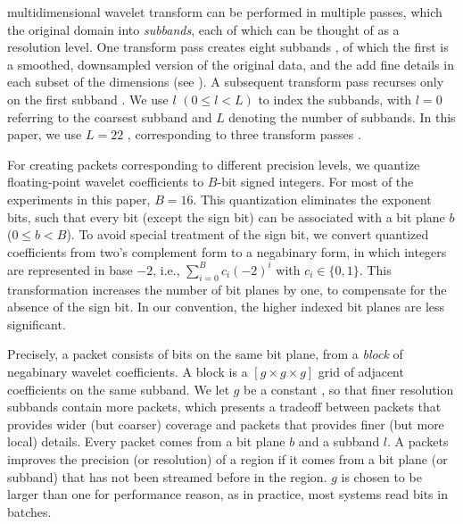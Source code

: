   multidimensional wavelet transform can be performed in
multiple passes, which   the
original domain  into 
\emph{subbands}, each of which can be thought of as a resolution level. One
transform pass  creates eight subbands , of which
the first is a smoothed, downsampled version of the original data, and the
  add fine details in each subset of the
dimensions (see 
). A subsequent transform pass recurses only on the first
subband . We use $l$ $(0 \leq
l < L)$ to index the subbands, with $l = 0$ referring to the coarsest subband
and $L$ denoting the number of subbands. In this paper, we use $L=22$
, corresponding to three transform passes .

 For creating packets
corresponding to different precision levels, we quantize floating-point
wavelet coefficients to $B$-bit signed integers. For most of the experiments
in this paper, $B=16$. This quantization eliminates the exponent bits, such
that every bit (except the sign bit) can be associated with a bit plane $b$
($0\leq b < B$). To avoid special treatment of the sign bit, we convert
quantized coefficients from two's complement form to a negabinary form, in
which integers are represented in base $-2$, i.e., $\sum_{i=0}^{B}{c_i(-2)^i}$
with $c_i\in \{0,1\}$. This transformation increases the number of bit planes
by one, to compensate for the absence of the sign bit. In our convention, the
higher indexed bit planes are less significant.

Precisely, a packet consists of bits on the same bit plane, from a
\emph{block} of negabinary wavelet coefficients. A block is a $[g\times
g\times g]$ grid of adjacent coefficients on the same subband.  We let $g$ be a constant
, so that finer resolution subbands contain more
packets, which presents a tradeoff between packets that provides wider (but
coarser) coverage and packets that provides finer (but more local) details.
Every packet comes from a bit plane $b$ and a subband $l$. A packets improves
the precision (or resolution) of a region if it comes from a bit plane (or
subband) that has not been streamed before in the region. $g$ is chosen to be
larger than one for performance reason, as in practice, most systems read bits
in batches.

